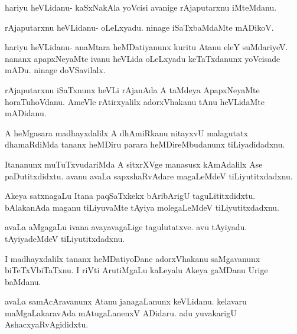 \documentclass{article}
\begin{document}
\begin{mng}%
hariyu heVLidanu- kaSxNakAla yoVcisi avanige rAjaputarxnu
iMteMdanu.
\end{mng}

\begin{mng}%
rAjaputarxnu heVLidanu- oLeLxyadu. ninage iSaTxbaMdaMte
mADikoV.
\end{mng}

\begin{mng}%
hariyu heVLidanu- anaMtara heMDatiyanunx kuritu Atanu 
eleY suMdariyeV. nananx apapxNeyaMte ivanu heVLida oLeLxyadu keTaTxdanunx
yoVcisade mADu. ninage doVSavilalx.
\end{mng}

\begin{mng}%
rAjaputarxnu iSaTxnunx heVLi rAjanAda A taMdeya ApapxNeyaMte
horaTuhoVdanu. AmeVle rAtirxyalilx adorxVhakanu tAnu heVLidaMte mADidanu.
\end{mng}

\begin{mng}%
A heMgasara madhayxdalilx A dhAmiRkanu nitayxvU malagutatx
dhamaRdiMda tananx heMDiru parara heMDireMbudanunx tiLiyadidadxnu.
\end{mng}

\begin{mng}%
Itananunx muTuTxvudariMda A sitxrXVge manasusx kAmAdalilx Ase
paDutitxdidxtu. avanu avaLa sapxshaRvAdare magaLeMdeV tiLiyutitxdadxnu.
\end{mng}

\begin{mng}%
Akeya satxnagaLu Itana paqSaTxkekx bAribArigU taguLititxdidxtu.
bAlakanAda maganu tiLiyuvaMte tAyiya molegaLeMdeV tiLiyutitxdadxnu.
\end{mng}

\begin{mng}%
avaLa aMgagaLu ivana avayavagaLige tagulutatxve. avu
tAyiyadu. tAyiyadeMdeV tiLiyutitxdadxnu.
\end{mng}

\begin{mng}%
I madhayxdalilx tananx heMDatiyoDane adorxVhakanu saMgavanunx
biTeTxVbiTaTxnu. I riVti ArutiMgaLu kaLeyalu Akeya gaMDanu Urige
baMdanu.
\end{mng}

\begin{mng}%
avaLa samAcAravanunx Atanu janagaLanunx keVLidanu. kelavaru
maMgaLakaravAda mAtugaLanenxV ADidaru. adu yuvakarigU AshacxyaRvAgididxtu.
\end{mng}
\end{document}
